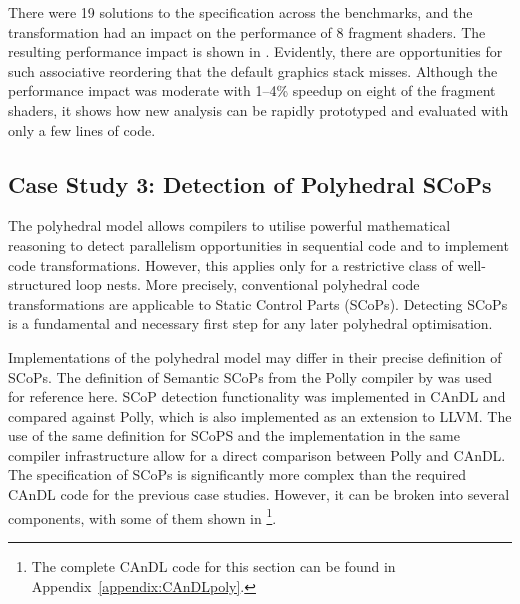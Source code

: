 
    There were 19 solutions to the specification across the benchmarks, and
    the transformation had an impact on the performance of 8 fragment shaders.
    The resulting performance impact is shown in .
    Evidently, there are opportunities for such associative reordering that
    the default graphics stack misses.
    Although the performance impact was moderate with 1--4\% speedup on eight
    of the fragment shaders, it shows how new analysis can be rapidly prototyped
    and evaluated with only a few lines of code.

\subsection{Case Study 3: Detection of Polyhedral SCoPs}

    The polyhedral model
    \citep{Karp:1967:OCU:321406.321418,benabderrahmane2010polyhedral} allows
    compilers to utilise powerful mathematical reasoning to detect parallelism
    opportunities in sequential code and to implement code transformations.
    However, this applies only for a restrictive class of well-structured loop
    nests.
    More precisely, conventional polyhedral code transformations are applicable
    to Static Control Parts (SCoPs).
    Detecting SCoPs is a fundamental and necessary first step for any later
    polyhedral optimisation.

    Implementations of the polyhedral model may differ in their precise
    definition of SCoPs.
    The definition of Semantic SCoPs from the Polly compiler by
    \citet{Lengauer2012Polly} was used for reference here.
    SCoP detection functionality was implemented in CAnDL and compared against
    Polly, which is also implemented as an extension to LLVM.
    The use of the same definition for SCoPS and the implementation in the same
    compiler infrastructure allow for a direct comparison between Polly and
    CAnDL.
    The specification of SCoPs is significantly more complex than the required
    CAnDL code for the previous case studies.
    However, it can be broken into several components, with some of them shown
    in 
    \footnote{The complete CAnDL code for this section can be found in
    Appendix~\ref{appendix:CAnDLpoly}.}.

